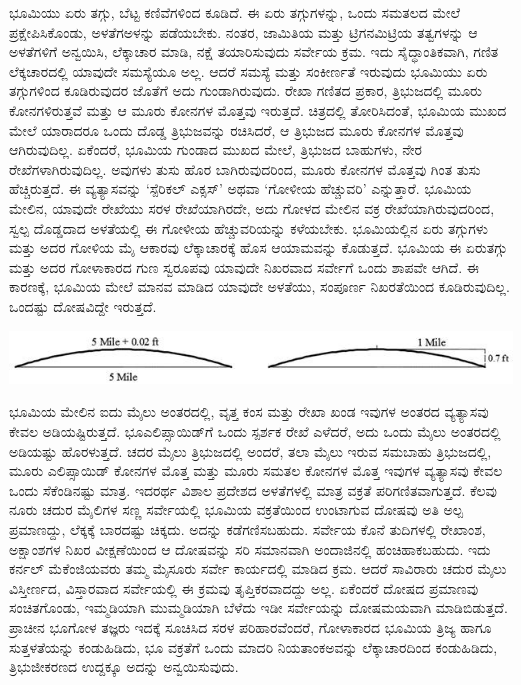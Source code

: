 ಭೂಮಿಯು ಏರು ತಗ್ಗು, ಬೆಟ್ಟ ಕಣಿವೆಗಳಿಂದ ಕೂಡಿದೆ. ಈ ಏರು ತಗ್ಗುಗಳನ್ನು, ಒಂದು ಸಮತಲದ ಮೇಲೆ ಪ್ರಕ್ಷೇಪಿಸಿಕೊಂಡು, ಅಳತೆಗಅಳನ್ನು ಪಡೆಯಬೇಕು. ನಂತರ, ಜಾಮಿತಿಯ ಮತ್ತು ಟ್ರಿಗನಮಿಟ್ರಿಯ ತತ್ವಗಳನ್ನು ಆ ಅಳತೆಗಳಿಗೆ ಅನ್ವಯಿಸಿ, ಲೆಕ್ಕಾಚಾರ ಮಾಡಿ, ನಕ್ಷೆ ತಯಾರಿಸುವುದು ಸರ್ವೇಯ ಕ್ರಮ. ಇದು ಸೈದ್ಧಾಂತಿಕವಾಗಿ, ಗಣಿತ ಲೆಕ್ಕಚಾರದಲ್ಲಿ ಯಾವುದೇ ಸಮಸ್ಯೆಯೂ ಅಲ್ಲ. ಆದರೆ ಸಮಸ್ಯೆ ಮತ್ತು ಸಂಕೀರ್ಣತೆ ಇರುವುದು ಭೂಮಿಯು ಏರು ತಗ್ಗುಗಳಿಂದ ಕೂಡಿರುವುದರ ಜೊತೆಗೆ ಅದು ಗುಂಡಾಗಿರುವುದು. ರೇಖಾ ಗಣಿತದ ಪ್ರಕಾರ, ತ್ರಿಭುಜದಲ್ಲಿ ಮೂರು ಕೋನಗಳಿರುತ್ತವೆ ಮತ್ತು ಆ ಮೂರು ಕೋನಗಳ ಮೊತ್ತವು  ಇರುತ್ತದೆ. ಚಿತ್ರದಲ್ಲಿ ತೋರಿಸಿದಂತೆ, ಭೂಮಿಯ ಮುಖದ ಮೇಲೆ ಯಾರಾದರೂ ಒಂದು ದೊಡ್ಡ ತ್ರಿಭುಜವನ್ನು ರಚಿಸಿದರೆ, ಆ ತ್ರಿಭುಜದ ಮೂರು ಕೋನಗಳ ಮೊತ್ತವು  ಆಗಿರುವುದಿಲ್ಲ. ಏಕೆಂದರೆ, ಭೂಮಿಯ ಗುಂಡಾದ ಮುಖದ ಮೇಲೆ, ತ್ರಿಭುಜದ ಬಾಹುಗಳು, ನೇರ ರೇಖೆಗಳಾಗಿರುವುದಿಲ್ಲ. ಅವುಗಳು ತುಸು ಹೊರ ಬಾಗಿರುವುದರಿಂದ, ಮೂರು ಕೋನಗಳ ಮೊತ್ತವು  ಗಿಂತ ತುಸು ಹೆಚ್ಚಿರುತ್ತದೆ. ಈ ವ್ಯತ್ಯಾಸವನ್ನು ‘ಸ್ಪೆರಿಕಲ್​ ಎಕ್ಸಸ್​’ ಅಥವಾ ‘ಗೋಳೀಯ ಹೆಚ್ಚುವರಿ’ ಎನ್ನುತ್ತಾರೆ. ಭೂಮಿಯ ಮೇಲಿನ, ಯಾವುದೇ ರೇಖೆಯು ಸರಳ ರೇಖೆಯಾಗಿರದೇ, ಅದು ಗೋಳದ ಮೇಲಿನ ವಕ್ರ ರೇಖೆಯಾಗಿರುವುದರಿಂದ, ಸ್ವಲ್ಪ ದೊಡ್ಡದಾದ ಅಳತೆಯಲ್ಲಿ ಈ ಗೋಳೀಯ ಹೆಚ್ಚುವರಿಯನ್ನು ಕಳೆಯಬೇಕು. ಭೂಮಿಯಲ್ಲಿನ ಏರು ತಗ್ಗುಗಳು ಮತ್ತು ಅದರ ಗೋಳಿಯ ಮೈ ಆಕಾರವು ಲೆಕ್ಕಾಚಾರಕ್ಕೆ ಹೊಸ ಆಯಾಮವನ್ನು ಕೊಡುತ್ತದೆ. ಭೂಮಿಯ ಈ ಏರುತಗ್ಗು ಮತ್ತು ಅದರ ಗೋಳಾಕಾರದ ಗುಣ ಸ್ವರೂಪವು ಯಾವುದೇ ನಿಖರವಾದ ಸರ್ವೇಗೆ ಒಂದು ಶಾಪವೇ ಆಗಿದೆ. ಈ ಕಾರಣಕ್ಕೆ, ಭೂಮಿಯ ಮೇಲೆ ಮಾನವ ಮಾಡಿದ ಯಾವುದೇ ಅಳತೆಯು, ಸಂಪೂರ್ಣ ನಿಖರತೆಯಿಂದ ಕೂಡಿರುವುದಿಲ್ಲ. ಒಂದಷ್ಟು ದೋಷವಿದ್ದೇ ಇರುತ್ತದೆ.

\begin{center}
\includegraphics[scale=0.5]{"images/image002.jpg"}
\end{center}

ಭೂಮಿಯ ಮೇಲಿನ ಐದು ಮೈಲು ಅಂತರದಲ್ಲಿ, ವೃತ್ತ ಕಂಸ ಮತ್ತು ರೇಖಾ ಖಂಡ ಇವುಗಳ ಅಂತರದ ವ್ಯತ್ಯಾಸವು ಕೇವಲ  ಅಡಿಯಷ್ಟಿರುತ್ತದೆ. ಭೂಎಲಿಪ್ಸಾಯಿಡ್​ಗೆ ಒಂದು ಸ್ಪರ್ಶಕ ರೇಖೆ ಎಳೆದರೆ, ಅದು ಒಂದು ಮೈಲು ಅಂತರದಲ್ಲಿ  ಅಡಿಯಷ್ಟು ಹೊರಳುತ್ತದೆ.  ಚದರ ಮೈಲು ತ್ರಿಭುಜದಲ್ಲಿ ಅಂದರೆ, ತಲಾ  ಮೈಲು ಇರುವ ಸಮಬಾಹು ತ್ರಿಭುಜದಲ್ಲಿ, ಮೂರು ಎಲಿಪ್ಸಾಯಿಡ್​ ಕೋನಗಳ ಮೊತ್ತ ಮತ್ತು ಮೂರು ಸಮತಲ ಕೋನಗಳ ಮೊತ್ತ ಇವುಗಳ ವ್ಯತ್ಯಾಸವು ಕೇವಲ ಒಂದು ಸೆಕೆಂಡಿನಷ್ಟು ಮಾತ್ರ. ಇದರರ್ಥ ವಿಶಾಲ ಪ್ರದೇಶದ ಅಳತೆಗಳಲ್ಲಿ ಮಾತ್ರ ವಕ್ರತೆ ಪರಿಗಣಿತವಾಗುತ್ತದೆ. ಕೆಲವು ನೂರು ಚದುರ ಮೈಲಿಗಳ ಸಣ್ಣ ಸರ್ವೇಯಲ್ಲಿ ಭೂಮಿಯ ವಕ್ರತೆಯಿಂದ ಉಂಟಾಗುವ ದೋಷವು ಅತಿ ಅಲ್ಪ ಪ್ರಮಾಣದ್ದು, ಲೆಕ್ಕಕ್ಕೆ ಬಾರದಷ್ಟು ಚಿಕ್ಕದು. ಅದನ್ನು ಕಡೆಗಣಿಸಬಹುದು. ಸರ್ವೇಯ ಕೊನೆ ತುದಿಗಳಲ್ಲಿ ರೇಖಾಂಶ, ಅಕ್ಷಾಂಶಗಳ ನಿಖರ ವೀಕ್ಷಣೆಯಿಂದ ಆ ದೋಷವನ್ನು ಸರಿ ಸಮಾನವಾಗಿ ಅಂದಾಜಿನಲ್ಲಿ ಹಂಚಿಹಾಕಬಹುದು. ಇದು ಕರ್ನಲ್​ ಮೆಕೆಂಜಿಯವರು ತಮ್ಮ ಮೈಸೂರು ಸರ್ವೇ ಕಾರ್ಯದಲ್ಲಿ ಮಾಡಿದ ಕ್ರಮ. ಆದರೆ ಸಾವಿರಾರು ಚದುರ ಮೈಲು ವಿಸ್ತೀರ್ಣದ, ವಿಸ್ತಾರವಾದ ಸರ್ವೇಯಲ್ಲಿ ಈ ಕ್ರಮವು ತೃಪ್ತಿಕರವಾದದ್ದು ಅಲ್ಲ. ಏಕೆಂದರೆ ದೋಷದ ಪ್ರಮಾಣವು ಸಂಚಿತಗೊಂಡು, ಇಮ್ಮಡಿಯಾಗಿ ಮುಮ್ಮಡಿಯಾಗಿ ಬೆಳೆದು ಇಡೀ ಸರ್ವೇಯನ್ನು ದೋಷಮಯವಾಗಿ ಮಾಡಿಬಿಡುತ್ತದೆ. ಪ್ರಾಚೀನ ಭೂಗೋಳ ತಜ್ಞರು ಇದಕ್ಕೆ ಸೂಚಿಸಿದ ಸರಳ ಪರಿಹಾರವೆಂದರೆ, ಗೋಳಾಕಾರದ ಭೂಮಿಯ ತ್ರಿಜ್ಯ ಹಾಗೂ ಸುತ್ತಳತೆಯನ್ನು ಕಂಡುಹಿಡಿದು, ಭೂ ವಕ್ರತೆಗೆ ಒಂದು ಮಾದರಿ ನಿಯತಾಂಕಅವನ್ನು ಲೆಕ್ಕಾಚಾರದಿಂದ ಕಂಡುಹಿಡಿದು, ತ್ರಿಭುಜೀಕರಣದ ಉದ್ದಕ್ಕೂ ಅದನ್ನು ಅನ್ವಯಿಸುವುದು.

